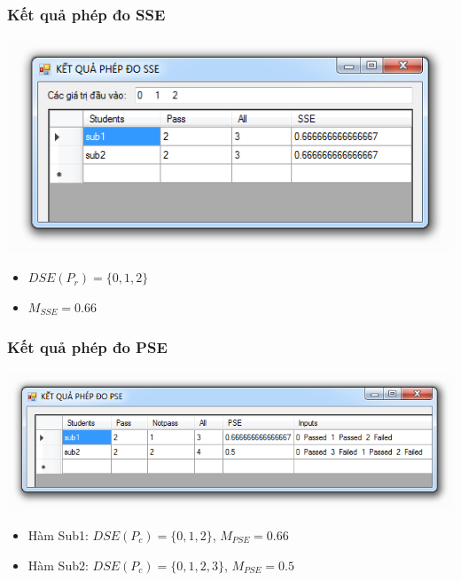 \documentclass{beamer}
\begin{document}
\begin{frame}
\frametitle{Kết quả phép đo SSE}
\includegraphics[width=0.8\linewidth]{images/kq_sse.png} 
\begin{itemize}
	\item $ DSE(P_r) = \{0, 1, 2\} $
	\item $ M_{SSE}= 0.66 $
\end{itemize}
\end{frame}

\begin{frame}
\frametitle{Kết quả phép đo PSE}
\includegraphics[width=1.0\linewidth]{images/kq_pse.png}
\begin{itemize}
	\item Hàm Sub1: $ DSE(P_{c}) = \{0, 1, 2\} $, $ M_{PSE}= 0.66 $
	\item Hàm Sub2: $ DSE(P_{c}) = \{0, 1, 2, 3\} $, $ M_{PSE}= 0.5 $
\end{itemize}
\end{frame}
\end{document}
